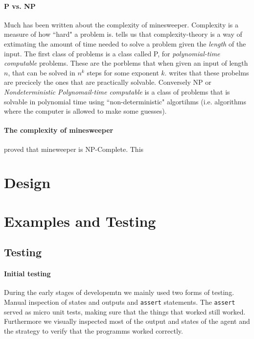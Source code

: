 \documentclass[british]{article}
\newcommand{\code}[1]{\texttt{#1}}
\begin{document}
\paragraph{P vs. NP} Much has been written about the complexity of minesweeper. Complexity is a measure of how ``hard" a problem is. \cite{Kaye00} tells us that complexity-theory is a way of extimating the amount of time needed to solve a problem given the \textit{length} of the input. The first class of problems is a class called P, for \textit{polynomial-time computable} problems. These are the porblems that when given an input of length $n$, that can be solved in $n^k$ steps for some exponent $k$. \citeauthor{Kaye00} writes that these probelms are precicely the ones that are practically solvable. Conversely NP or \textit{Nondeterministic Polynomail-time computable} is a class of problems that is solvable in polynomial time using ``non-deterministic" algortihms (i.e. algorithms where the computer is allowed to make some guesses).  

\paragraph{The complexity of minesweeper} \cite{Kaye00} proved that mineweeper is NP-Complete. This 
 
\section{Design}
\label{design}


\section{Examples and Testing}
\label{sec:testing}
 
\subsection{Testing}
\label{subsec:testing}
\paragraph{Initial testing} During the early stages of developemtn we mainly used two forms of testing. Manual inspection of states and outputs and \code{assert} statements. The \code{assert} served as micro unit tests, making sure that the things that worked still worked. Furthermore we visually inspected most of the output and states of the agent and the strategy to verify that the programms worked correctly. 
\end{document}

